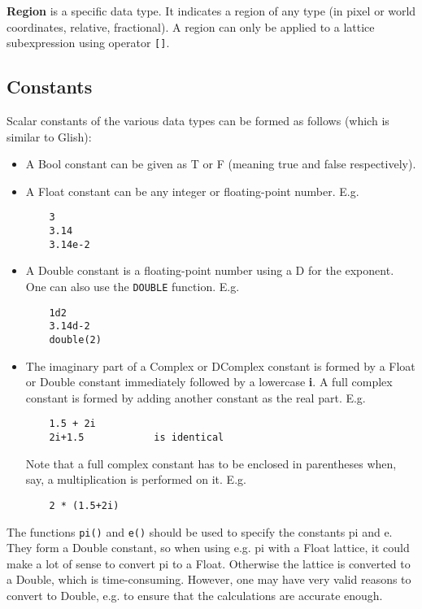 \textbf{Region} is a specific data type. It indicates a region of any type
(in pixel or world coordinates, relative, fractional).
A region can only be applied to a lattice subexpression using
operator \texttt{[]}.


\subsection{\label{LEL:CONSTANTS}Constants}
Scalar constants of the various data types can be formed as follows
(which is similar to Glish):
\begin{itemize}
  \item A Bool constant can be given as T or F
        (meaning true and false respectively).
  \item A Float constant can be any integer or floating-point number. E.g.
    \begin{verbatim}
    3
    3.14
    3.14e-2
    \end{verbatim}
  \item A Double constant is a floating-point number using a D for the
    exponent. One can also use the \texttt{DOUBLE} function. E.g.
    \begin{verbatim}
    1d2
    3.14d-2
    double(2)
    \end{verbatim}
  \item The imaginary part of a Complex or DComplex constant is formed
    by a Float or Double constant immediately followed by a lowercase
    \textbf{i}. A full complex
    constant is formed by adding another constant as the
    real part. E.g.
    \begin{verbatim}
    1.5 + 2i
    2i+1.5            is identical
    \end{verbatim}
    Note that a full complex constant has to be enclosed
    in parentheses when, say, a multiplication is performed on it. E.g.
    \begin{verbatim}
    2 * (1.5+2i)
    \end{verbatim}
\end{itemize}
The functions \texttt{pi()} and \texttt{e()} should be
used to specify the constants pi and e. They form a Double constant,
so when using e.g. pi with a Float lattice, it could make a lot of sense
to convert pi to a Float. Otherwise the lattice is converted to a
Double, which is time-consuming. However, one may have very valid
reasons to convert to Double, e.g. to ensure that the calculations are
accurate enough.

